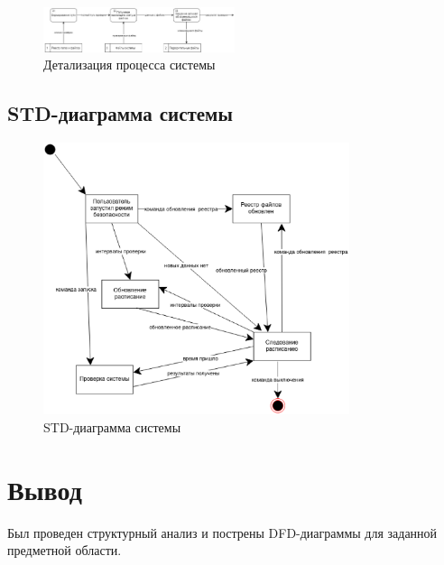 \begin{figure}[h!]
	\centering
	\includegraphics[width=0.5\textwidth]{images/2/detail.eps}
	\caption{Детализация процесса системы}
\end{figure}

\subsection{STD-диаграмма системы}

\begin{figure}[h!]
	\centering
	\includegraphics[width=0.8\textwidth]{images/2/std.eps}
	\caption{STD-диаграмма системы}
\end{figure}
\section{Вывод}

Был проведен структурный анализ и пострены DFD-диаграммы для заданной предметной области. 
